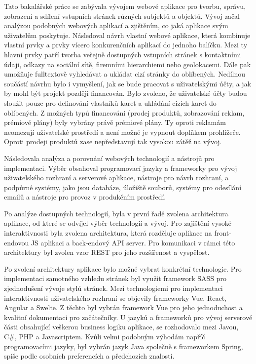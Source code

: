 Tato bakalářské práce se zabývala vývojem webové aplikace pro tvorbu, správu, zobrazení a sdílení vstupních stránek
různých subjektů a objektů.
Vývoj začal analýzou podobných webových aplikací a zjištěním, co jaká aplikace svým uživatelům poskytuje.
Následoval návrh vlastní webové aplikace, která kombinuje vlastní prvky a prvky vícero konkurenčních aplikací do jednoho balíčku.
Mezi ty hlavní prvky patří tvorba veřejně dostupných vstupních stránek s kontaktními údaji, odkazy na sociální sítě, firemními hierarchiemi nebo geolokacemi.
Dále pak umožňuje fulltextově vyhledávat a ukládat cizí stránky do oblíbených.
Nedílnou součástí návrhu bylo i vymyšlení, jak se bude pracovat s uživatelskými účty, a jak by mohl být projekt později
financován.
Bylo zvoleno, že uživatelské účty budou sloužit pouze pro definování vlastníků karet a ukládání cizích karet do oblíbených.
Z možných typů financování (prodej produktů, zobrazování reklam, prémiové plány) byly vybrány právě prémiové plány.
Ty oproti reklamám neomezují uživatelské prostředí a není možné je vypnout doplňkem prohlížeče.
Oproti prodeji produktů zase nepředstavují tak vysokou zátěž na vývoj.

Následovala analýza a porovnání webových technologií a nástrojů pro implementaci.
Výběr obsahoval programovací jazyky a frameworky pro vývoj uživatelského rozhraní a serverové aplikace, nástroje pro návrh
rozhraní, a podpůrné systémy, jako jsou databáze, úložiště souborů, systémy pro odesílání emailů a nástroje pro provoz
v produkčním prostředí.

Po analýze dostupných technologií, byla v první řadě zvolena architektura aplikace, od které se odvíjel výběr technologií a vývoj.
Pro zajištění vysoké interaktivnosti byla zvolena architektura, která rozděluje aplikace na front-endovou \ac{JS} aplikaci a back-endový
\ac{API} server.
Pro komunikaci v rámci této architektury byl zvolen vzor \ac{REST} pro jeho rozšířenost a vyspělost.

Po zvolení architektury aplikace bylo možné vybrat konkrétní technologie.
Pro implementaci samotného vzhledu stránek byl využit framework \ac{SASS} pro zjednodušení vývoje stylů stránek.
Mezi technologiemi pro implementaci interaktivnosti uživatelského rozhraní se objevily frameworky Vue, React, Angular a Swelte.
Z těchto byl vybrán framework Vue pro jeho jednoduchost a kvalitní dokumentaci pro začátečníky.
U jazyků a frameworků pro vývoj serverové části obsahující veškerou business logiku aplikace, se rozhodovalo mezi Javou,
C\#, PHP a Javascriptem.
Kvůli velmi podobným výhodám napříč programovacími jazyky, byl vybrán jazyk Java společně s frameworkem Spring, spíše podle
osobních preferencích a předchozích znalostí.

